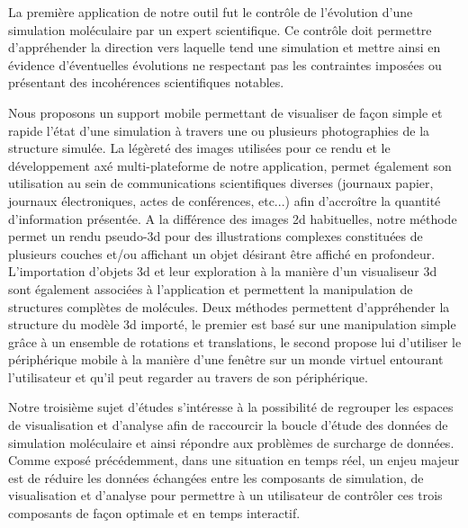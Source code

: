La première application de notre outil fut le contrôle de l'évolution d'une simulation moléculaire par un expert scientifique. Ce contrôle doit permettre d'appréhender la direction vers laquelle tend une simulation et mettre ainsi en évidence d'éventuelles évolutions ne respectant pas les contraintes imposées ou présentant des incohérences scientifiques notables. 

Nous proposons un support mobile permettant de visualiser de façon simple et rapide l'état d'une simulation à travers une ou plusieurs photographies de la structure simulée. La légèreté des images utilisées pour ce rendu et le développement axé multi-plateforme de notre application, permet également son utilisation au sein de communications scientifiques diverses (journaux papier, journaux électroniques, actes de conférences, etc...) afin d’accroître la quantité d'information présentée. A la différence des images 2d habituelles, notre méthode permet un rendu pseudo-3d pour des illustrations complexes constituées de plusieurs couches et/ou affichant un objet désirant être affiché en profondeur. 
L'importation d'objets 3d et leur exploration à la manière d'un visualiseur 3d sont également associées à l'application et permettent la manipulation de structures complètes de molécules. Deux méthodes permettent d'appréhender la structure du modèle 3d importé, le premier est basé sur une manipulation simple grâce à un ensemble de rotations et translations, le second propose lui d'utiliser le périphérique mobile à la manière d'une fenêtre sur un monde virtuel entourant l'utilisateur et qu'il peut regarder au travers de son périphérique.


Notre troisième sujet d'études s'intéresse à la possibilité de regrouper les espaces de visualisation et d'analyse afin de raccourcir la boucle d'étude des données de simulation moléculaire et ainsi répondre aux problèmes de surcharge de données. Comme exposé précédemment, dans une situation en temps réel, un enjeu majeur est de réduire les données échangées entre les composants de simulation, de visualisation et d'analyse pour permettre à un utilisateur de contrôler ces trois composants de façon optimale et en temps interactif.


